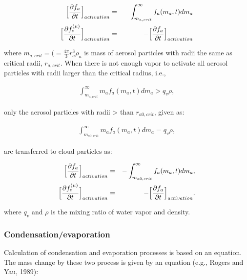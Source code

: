 \begin{eqnarray}
\Bigl[\frac{\partial f_{a}}{\partial t}\Bigr]_{activation}&=&-\int_{m_{a,crit}}^{\infty}f_{a}(m_{a},t)dm_{a}\label{s10-4}\\
\Bigl[\frac{\partial f_{c}^{(\mu)}}{\partial t}\Bigr]_{activation}&=&-\Bigl[\frac{\partial f_{a}}{\partial t}\Bigr]_{activation}\label{s10-5}
\end{eqnarray}

where $m_{a,crit}=\bigl(=\frac{4\pi}{3}r_{a}^{3}\rho_{a}$ is mass of aerosol particles with radii the same as critical radii, $r_{a,crit}$. When there is not enough vapor to activate all aerosol particles with radii larger than the critical radius, i.e.,

\begin{eqnarray}
\int_{m_{a,crit}}^{\infty}m_{a}f_{a}(m_{a},t)dm_{a} > q_{v}\rho,\label{s10-6}
\end{eqnarray}

only the aerosol particles with radii > than $r_{a0,crit}$, given as:

\begin{eqnarray}
\int_{m_{a0,crit}}^{\infty}m_{a}f_{a}(m_{a},t)dm_{a} = q_{v}\rho,\label{s10-7}
\end{eqnarray}


are transferred to cloud particles as:

\begin{eqnarray}
\Bigl[\frac{\partial f_{a}}{\partial t}\Bigr]_{activation}&=&-\int_{m_{a0,crit}}^{\infty}f_{a}(m_{a},t)dm_{a},\label{s10-8}\\
\Bigl[\frac{\partial f_{c}^{(\mu)}}{\partial t}\Bigr]_{activation}&=&-\Bigl[\frac{\partial f_{a}}{\partial t}\Bigr]_{activation}.\label{s10-9}
\end{eqnarray}

where $q_{v}$ and $\rho$ is the mixing ratio of water vapor and density.

\subsubsection{Condensation/evaporation}
Calculation of condensation and evaporation processes is based on an equation. The mass change by these two process is given by an equation (e.g., Rogers and Yau, 1989\cite{ry_1989}):

